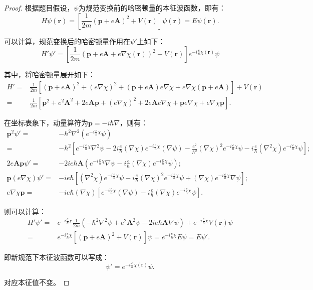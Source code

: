 \documentclass[reqno,a4paper,12pt]{amsart}
\begin{document}
\begin{proof}

根据题目假设，$\psi$为规范变换前的哈密顿量的本征波函数，即有：
\[
	H \psi(\mathbf{r}) = \left[ \frac{1}{2m} (\mathbf{p}+e\mathbf{A})^2 + V(\mathbf{r}) \right] \psi(\mathbf{r}) = E \psi(\mathbf{r}).
\]

可以计算，规范变换后的哈密顿量作用在$\psi'$上如下：
\[
	H'\psi' = \left[ \frac{1}{2m}(\mathbf{p} + e\mathbf{A} + e\nabla \chi(\mathbf{r}))^2 + V(\mathbf{r}) \right] e^{-i\frac{e}{\hbar} \chi(\mathbf{r})}\psi
\]

其中，将哈密顿量展开如下：
\begin{align*}
	H' =& \frac{1}{2m}[ (\mathbf{p} + e\mathbf{A})^2 + (e\nabla\chi)^2 + (\mathbf{p} + e\mathbf{A})e\nabla \chi + e\nabla\chi(\mathbf{p} + e\mathbf{A}) ] + V(\mathbf{r}) \\
	=& \frac{1}{2m}[\mathbf{p}^2 + e^2\mathbf{A}^2 + 2e\mathbf{A} \mathbf{p} + (e\nabla\chi)^2 + 2e\mathbf{A}e\nabla\chi + \mathbf{p}e\nabla\chi + e\nabla\chi \mathbf{p}].
\end{align*}

在坐标表象下，动量算符为$\mathbf{p} = -i\hbar\nabla$，则有：
\begin{align*}
	\mathbf{p}^2 \psi' =& -\hbar^2\nabla^2\left( e^{-i\frac{e}{\hbar} \chi}\psi \right) \\
	=& -\hbar^2\left[ e^{-i\frac{e}{\hbar} \chi} \nabla^2\psi - 2i\frac{e}{\hbar} (\nabla\chi) e^{-i\frac{e}{\hbar} \chi} (\nabla \psi) - \frac{e^2}{\hbar^2}(\nabla\chi)^2 e^{-i\frac{e}{\hbar} \chi} \psi - i\frac{e}{\hbar} (\nabla^2\chi) e^{-i\frac{e}{\hbar} \chi} \psi \right]; \\
	2e\mathbf{A} \mathbf{p} \psi' =& -2ie\hbar\mathbf{A} \left( e^{-i\frac{e}{\hbar} \chi} \nabla\psi - i\frac{e}{\hbar}(\nabla\chi) e^{-i\frac{e}{\hbar} \chi} \psi \right); \\
	\mathbf{p} (e\nabla\chi) \psi' =& -ie\hbar \left[ (\nabla^2\chi) e^{-i\frac{e}{\hbar} \chi} \psi - i\frac{e}{\hbar}(\nabla\chi)^2 e^{-i\frac{e}{\hbar} \chi} \psi + (\nabla\chi) e^{-i\frac{e}{\hbar} \chi} \nabla\psi \right]; \\
	e\nabla\chi \mathbf{p} =& -ie\hbar (\nabla\chi) \left[ e^{-i\frac{e}{\hbar} \chi} (\nabla\psi) - i\frac{e}{\hbar} (\nabla\chi) e^{-i\frac{e}{\hbar} \chi} \psi \right].
\end{align*}

则可以计算：
\begin{align*}
	H' \psi' =& e^{-i\frac{e}{\hbar} \chi} \frac{1}{2m} (-\hbar^2\nabla^2\psi + e^2\mathbf{A}^2 \psi - 2ie\hbar \mathbf{A} \nabla\psi) + e^{-i\frac{e}{\hbar} \chi} V(\mathbf{r}) \psi \\
	=& e^{-i\frac{e}{\hbar} \chi} \left[ (\mathbf{p} + e\mathbf{A})^2 + V(\mathbf{r}) \right]\psi = e^{-i\frac{e}{\hbar} \chi} E\psi = E \psi'.
\end{align*}

即新规范下本征波函数可以写成：
\[
	\psi' = e^{-i\frac{e}{\hbar} \chi(\mathbf{r})} \psi.
\]

对应本征值不变。
\end{proof}
\end{document}
